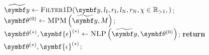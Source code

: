 \begin{algorithm}
    \begin{algorithmic}[1]
        \caption[
            An overview of the \ac{1D} estimation procedure outlined in this work.
        ]{
            An overview of the estimation procedure outlined in this work, for
            the consideration of \ac{1D} \acp{FID}.
        }
        \label{alg:1d-2d-summary}
            \State $\widetilde{\by} \gets \textsc{Filter}1\textsc{D}(
                \by,
                l_{\text{I}},
                r_{\text{I}},
                l_{\text{N}},
                r_{\text{N}},
                \chi \in \mathbb{R}_{>1},
            )
            $;
            \State $\bthzero \gets \textsc{MPM}\left(\widetilde{\by}, M\right)$;
            \State $\bthstar, \symbf{\epsilon}^{(*)} \gets \textsc{NLP}\left(\widetilde{\by}, \bthzero\right)$;
            \State \textbf{return} $\bthstar, \symbf{\epsilon}^{(*)}$;
        \EndProcedure
    \end{algorithmic}
\end{algorithm}

